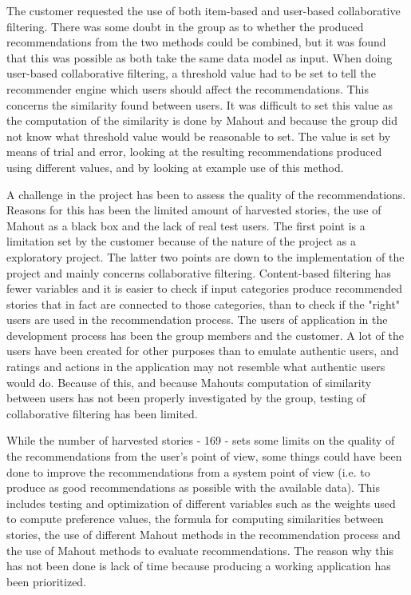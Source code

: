 The customer requested the use of both item-based and user-based collaborative filtering. There was some doubt in the group as to whether the produced recommendations from the two methods could be combined, but it was found that this was possible as both take the same data model as input. When doing user-based collaborative filtering, a threshold value had to be set to tell the recommender engine which users should affect the recommendations. This concerns the similarity found between users. It was difficult to set this value as the computation of the similarity is done by Mahout and because the group did not know what threshold value would be reasonable to set. The value is set by means of trial and error, looking at the resulting recommendations produced using different values, and by looking at example use of this method. \newline

A challenge in the project has been to assess the quality of the recommendations. Reasons for this has been the limited amount of harvested stories, the use of Mahout as a black box and the lack of real test users. The first point is a limitation set by the customer because of the nature of the project as a exploratory project. The latter two points are down to the implementation of the project and mainly concerns collaborative filtering. Content-based filtering has fewer variables and it is easier to check if input categories produce recommended stories that in fact are connected to those categories, than to check if the "right" users are used in the recommendation process. The users of application in the development process has been the group members and the customer. A lot of the users have been created for other purposes than to emulate authentic users, and ratings and actions in the application may not resemble what authentic users would do. Because of this, and because Mahouts computation of similarity between users has not been properly investigated by the group, testing of collaborative filtering has been limited. \newline  

While the number of harvested stories - 169 - sets some limits on the quality of the recommendations from the user's point of view, some things could have been done to improve the recommendations from a system point of view (i.e. to produce as good recommendations as possible with the available data). This includes testing and optimization of different variables such as the weights used to compute preference values, the formula for computing similarities between stories, the use of different Mahout methods in the recommendation process and the use of Mahout methods to evaluate recommendations. The reason why this has not been done is lack of time because producing a working application has been prioritized. 

